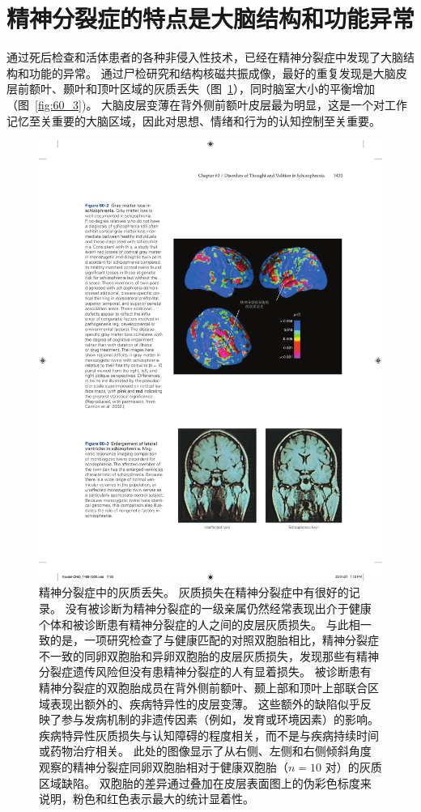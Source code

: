 \section{精神分裂症的特点是大脑结构和功能异常}

通过死后检查和活体患者的各种非侵入性技术，已经在精神分裂症中发现了大脑结构和功能的异常。
通过尸检研究和结构核磁共振成像，最好的重复发现是大脑皮层前额叶、颞叶和顶叶区域的灰质丢失（图~\ref{fig:60_2}），同时脑室大小的平衡增加（图~\ref{fig:60_3})。
大脑皮层变薄在背外侧前额叶皮层最为明显，这是一个对工作记忆至关重要的大脑区域，因此对思想、情绪和行为的认知控制至关重要。



\begin{figure}[htbp]
	\centering
	\includegraphics[width=0.8\linewidth]{chap60/fig_60_2}
	\caption{精神分裂症中的灰质丢失。
		灰质损失在精神分裂症中有很好的记录。
		没有被诊断为精神分裂症的一级亲属仍然经常表现出介于健康个体和被诊断患有精神分裂症的人之间的皮层灰质损失。
		与此相一致的是，一项研究检查了与健康匹配的对照双胞胎相比，精神分裂症不一致的同卵双胞胎和异卵双胞胎的皮层灰质损失，发现那些有精神分裂症遗传风险但没有患精神分裂症的人有显着损失。
		被诊断患有精神分裂症的双胞胎成员在背外侧前额叶、颞上部和顶叶上部联合区域表现出额外的、疾病特异性的皮层变薄。
		这些额外的缺陷似乎反映了参与发病机制的非遗传因素（例如，发育或环境因素）的影响。
		疾病特异性灰质损失与认知障碍的程度相关，而不是与疾病持续时间或药物治疗相关。
		此处的图像显示了从右侧、左侧和右侧倾斜角度观察的精神分裂症同卵双胞胎相对于健康双胞胎（$ n = 10 $ 对）的灰质区域缺陷。
		双胞胎的差异通过叠加在皮层表面图上的伪彩色标度来说明，粉色和红色表示最大的统计显着性\cite{cannon2002cortex}。}
	\label{fig:60_2}
\end{figure}


